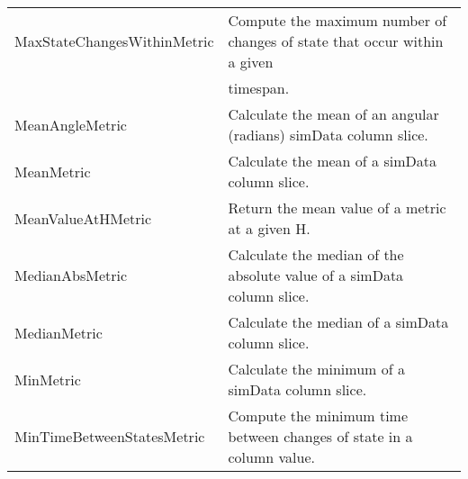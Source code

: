 \begin{table}[!t]
\begin{tabular}{ll}
 MaxStateChangesWithinMetric &  Compute the maximum number of changes of state that occur within a given \\
  &  timespan. \\
 MeanAngleMetric &  Calculate the mean of an angular (radians) simData column slice. \\
 MeanMetric &  Calculate the mean of a simData column slice. \\
 MeanValueAtHMetric &  Return the mean value of a metric at a given H. \\
 MedianAbsMetric &  Calculate the median of the absolute value of a simData column slice. \\
 MedianMetric &  Calculate the median of a simData column slice. \\
 MinMetric &  Calculate the minimum of a simData column slice. \\
 MinTimeBetweenStatesMetric &  Compute the minimum time between changes of state in a column value. \\
\end{tabular}
\end{table}

